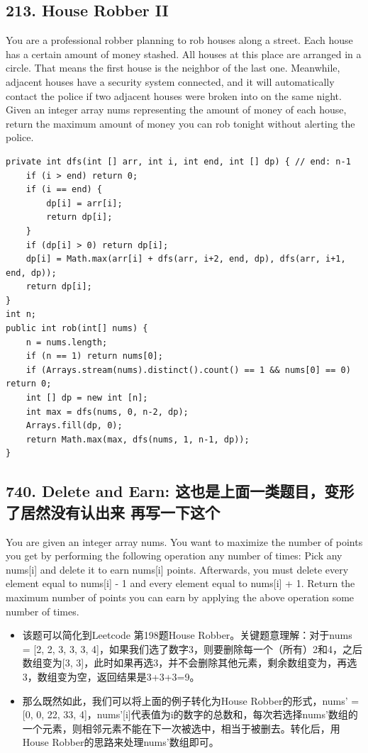 \documentclass[9pt, b5paper]{article}
\begin{document}
\subsection{213. House Robber II}
\label{sec-4-25}
You are a professional robber planning to rob houses along a street. Each house has a certain amount of money stashed. All houses at this place are arranged in a circle. That means the first house is the neighbor of the last one. Meanwhile, adjacent houses have a security system connected, and it will automatically contact the police if two adjacent houses were broken into on the same night.
Given an integer array nums representing the amount of money of each house, return the maximum amount of money you can rob tonight without alerting the police.
\begin{verbatim}
private int dfs(int [] arr, int i, int end, int [] dp) { // end: n-1
    if (i > end) return 0;
    if (i == end) {
        dp[i] = arr[i];
        return dp[i];
    }
    if (dp[i] > 0) return dp[i];
    dp[i] = Math.max(arr[i] + dfs(arr, i+2, end, dp), dfs(arr, i+1, end, dp));
    return dp[i];
}
int n;
public int rob(int[] nums) {
    n = nums.length;
    if (n == 1) return nums[0];
    if (Arrays.stream(nums).distinct().count() == 1 && nums[0] == 0) return 0;
    int [] dp = new int [n];
    int max = dfs(nums, 0, n-2, dp);
    Arrays.fill(dp, 0);
    return Math.max(max, dfs(nums, 1, n-1, dp));
}
\end{verbatim}

\subsection{740. Delete and Earn: 这也是上面一类题目，变形了居然没有认出来 再写一下这个}
\label{sec-4-26}
You are given an integer array nums. You want to maximize the number of points you get by performing the following operation any number of times:
Pick any nums[i] and delete it to earn nums[i] points. Afterwards, you must delete every element equal to nums[i] - 1 and every element equal to nums[i] + 1.
Return the maximum number of points you can earn by applying the above operation some number of times.
\begin{itemize}
\item 该题可以简化到Leetcode 第198题House Robber。关键题意理解：对于nums = [2, 2, 3, 3, 3, 4]，如果我们选了数字3，则要删除每一个（所有）2和4，之后数组变为[3, 3]，此时如果再选3，并不会删除其他元素，剩余数组变为\footnotemark[1]{}，再选3，数组变为空，返回结果是3+3+3=9。
\item 那么既然如此，我们可以将上面的例子转化为House Robber的形式，nums' = [0, 0, 22, 33, 4]，nums'[i]代表值为i的数字的总数和，每次若选择nums'数组的一个元素，则相邻元素不能在下一次被选中，相当于被删去。转化后，用House Robber的思路来处理nums'数组即可。
\end{itemize}
\end{document}

